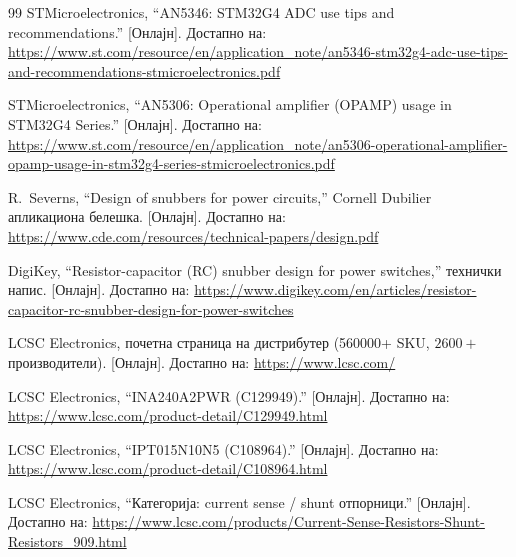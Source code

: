 \documentclass[journal,onecolumn,11pt]{IEEEtran}
\begin{document}
\begin{thebibliography}{99}
 STMicroelectronics, ``AN5346: STM32G4 ADC use tips and recommendations.'' [Онлајн].
Достапно на:
\url{https://www.st.com/resource/en/application_note/an5346-stm32g4-adc-use-tips-and-recommendations-stmicroelectronics.pdf}

 STMicroelectronics, ``AN5306: Operational amplifier (OPAMP) usage in STM32G4 Series.''
[Онлајн]. Достапно на:
\url{https://www.st.com/resource/en/application_note/an5306-operational-amplifier-opamp-usage-in-stm32g4-series-stmicroelectronics.pdf}

 R.~Severns, ``Design of snubbers for power circuits,'' Cornell Dubilier апликациона
белешка. [Онлајн]. Достапно на: \url{https://www.cde.com/resources/technical-papers/design.pdf}

 DigiKey, ``Resistor-capacitor (RC) snubber design for power switches,''
технички напис. [Онлајн]. Достапно на:
\url{https://www.digikey.com/en/articles/resistor-capacitor-rc-snubber-design-for-power-switches}

 LCSC Electronics, почетна страница на дистрибутер (\num{560000}+ SKU, \(2600+\)
производители). [Онлајн]. Достапно на: \url{https://www.lcsc.com/}

 LCSC Electronics, ``INA240A2PWR (C129949).'' [Онлајн]. Достапно на:
\url{https://www.lcsc.com/product-detail/C129949.html}

 LCSC Electronics, ``IPT015N10N5 (C108964).'' [Онлајн]. Достапно на:
\url{https://www.lcsc.com/product-detail/C108964.html}

 LCSC Electronics, ``Категорија: current sense / shunt отпорници.'' [Онлајн].
Достапно на: \url{https://www.lcsc.com/products/Current-Sense-Resistors-Shunt-Resistors_909.html}
\end{thebibliography}
\end{document}
